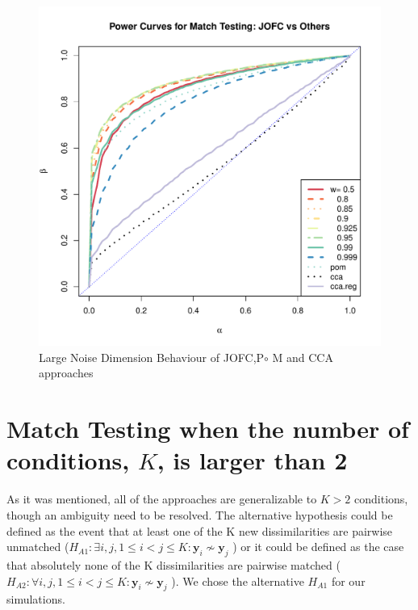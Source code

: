 \documentclass[12pt,oneside,final]{thesis}
\begin{document}
\begin{figure}
\includegraphics[scale=0.8]{MVN_JOFC_q_90_c_0_001}
\caption{Large Noise Dimension Behaviour of JOFC,P$\circ$ M and CCA approaches}
\label{fig:largeq}
\end{figure}


\section{Match Testing when the number of\\ conditions, $K$, is larger than 2\label{k_more_than_two_experiment}}


As it was mentioned, all of the approaches are generalizable to $K>2$ conditions, though an ambiguity need to be resolved. The alternative hypothesis could be  defined as the event that at least one of the K new dissimilarities are pairwise unmatched ($ H_{A1}: \exists i, j , 1\leq i < j \leq K :\bm{y}_{i} \nsim \bm{y}_{j} $ ) or it could be defined as the case that absolutely none of the K dissimilarities are pairwise matched   ($H_{A2}: \forall i, j , 1\leq i < j \leq K :\bm{y}_{i} \nsim \bm{y}_{j}$ ). We chose the alternative   $ H_{A1}$ for our simulations.
\end{document}

